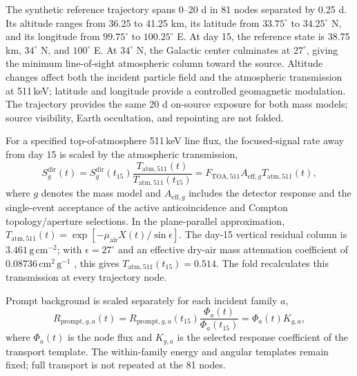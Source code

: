 \documentclass[11pt]{article}
\begin{document}
The synthetic reference trajectory spans 0--20 d in 81 nodes separated by
0.25 d. Its altitude ranges from 36.25 to 41.25 km, its latitude from
$33.75^\circ$ to $34.25^\circ$ N, and its longitude from $99.75^\circ$ to
$100.25^\circ$ E. At day 15, the reference state is 38.75 km,
$34^\circ$ N, and $100^\circ$ E. At $34^\circ$ N, the Galactic center
culminates at $27^\circ$, giving the minimum line-of-sight atmospheric column
toward the source. Altitude changes affect both the incident
particle field and the atmospheric transmission at 511\,keV; latitude and
longitude provide a controlled geomagnetic modulation. The trajectory provides
the same 20 d on-source exposure for both mass models; source visibility,
Earth occultation, and repointing are not folded.

For a specified top-of-atmosphere 511\,keV line flux, the focused-signal rate
away from day 15 is scaled by the atmospheric transmission,
\begin{equation}
 S^{\mathrm{dir}}_g(t)
 =S^{\mathrm{dir}}_g(t_{15})
 \frac{T_{\mathrm{atm},511}(t)}{T_{\mathrm{atm},511}(t_{15})}
 =F_{\mathrm{TOA},511}A_{\mathrm{eff},g}T_{\mathrm{atm},511}(t),
 \label{eq:mission_signal}
\end{equation}
where $g$ denotes the mass model and $A_{\mathrm{eff},g}$ includes the detector
response and the single-event acceptance of the active anticoincidence and
Compton topology/aperture selections. In the plane-parallel approximation,
$T_{\mathrm{atm},511}(t)=\exp[-\mu_{\mathrm{air}}X(t)/\sin\epsilon]$. The
day-15 vertical residual column is $3.461\,\mathrm{g\,cm^{-2}}$; with
$\epsilon=27^\circ$ and an effective dry-air mass attenuation coefficient of
$0.08736\,\mathrm{cm^2\,g^{-1}}$ \cite{NISTXCOM}, this gives
$T_{\mathrm{atm},511}(t_{15})=0.514$. The fold recalculates this transmission
at every trajectory node.

Prompt background is scaled separately for each incident family $a$,
\begin{equation}
 R_{\mathrm{prompt},g,a}(t)
 =R_{\mathrm{prompt},g,a}(t_{15})
 \frac{\Phi_a(t)}{\Phi_a(t_{15})}
 =\Phi_a(t)K_{g,a},
 \label{eq:prompt_source_response}
\end{equation}
where $\Phi_a(t)$ is the node flux and $K_{g,a}$ is the selected response
coefficient of the transport template. The within-family energy and angular
templates remain fixed; full transport is not repeated at the 81 nodes.
\end{document}
